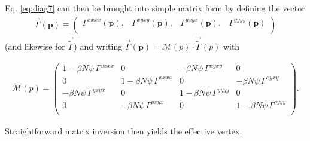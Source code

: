 \documentclass[aps,pra,reprint,showpacs,superscriptaddress]{revtex4-1}
\newcommand\bs[1]{\ensuremath{\boldsymbol{#1}}}
\begin{document}
Eq. \eqref{eq:diag7} can then be brought into simple matrix form by defining the vector
\begin{align}
\vec{\Gamma}(\bs{p})\equiv
\begin{pmatrix}
\Gamma^{xxxx}(\bs{p}), &
\Gamma^{xyxy}(\bs{p}), &
\Gamma^{yxyx}(\bs{p}), &
\Gamma^{yyyy}(\bs{p}) \\
\end{pmatrix}\label{eq:diag9}
\end{align}
(and likewise for $\vec{\tilde{\Gamma}}$) and writing $\vec{\Gamma}(\bs{p})=\mathcal{M}(p)\cdot \vec{\tilde{\Gamma}}(p)$ with
\begin{widetext}
\begin{align}
\mathcal{M}(p)=
\begin{pmatrix}
1-\beta N \psi\, \Gamma^{xxxx} & 0 & -\beta N\psi\,\Gamma^{xyxy} & 0\\
0 & 1-\beta N \psi\,\Gamma^{xxxx} & 0 & -\beta N \psi\,\Gamma^{xyxy} \\
-\beta N \psi\,\Gamma^{yxyx} & 0 & 1-\beta N\psi\,\Gamma^{yyyy} & 0 \\
0 & -\beta N\psi\,\Gamma^{yxyx} & 0 & 1-\beta N\psi\,\Gamma^{yyyy} \\
\end{pmatrix}.\label{eq:diag10}
\end{align}
\end{widetext}
Straightforward matrix inversion then yields the effective vertex.
\end{document}

